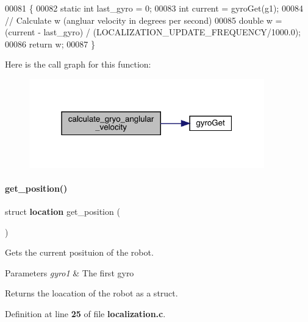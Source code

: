 \begin{DoxyCode}
00081                                                  \{
00082   \textcolor{keyword}{static} \textcolor{keywordtype}{int} last\_gyro = 0;
00083   \textcolor{keywordtype}{int} current = gyroGet(g1);
00084   \textcolor{comment}{// Calculate w (angluar velocity in degrees per second)}
00085   \textcolor{keywordtype}{double} w = (current - last\_gyro) / (LOCALIZATION_UPDATE_FREQUENCY/1000.0);
00086   \textcolor{keywordflow}{return} w;
00087 \}
\end{DoxyCode}
Here is the call graph for this function\+:\nopagebreak
\begin{figure}[H]
\begin{center}
\leavevmode
\includegraphics[width=289pt]{localization_8c_aa849dcc7cd296f4556fab3b57c1c4d3e_cgraph}
\end{center}
\end{figure}
\mbox{\label{localization_8c_aadbff35bb757f60bc348d4d778f57a2f}} 
\paragraph{get\+\_\+position()}
{\footnotesize\ttfamily struct \textbf{ location} get\+\_\+position (\begin{DoxyParamCaption}{ }\end{DoxyParamCaption})}



Gets the current posituion of the robot. 


\begin{DoxyParams}{Parameters}
{\em gyro1} & The first gyro \\
\hline
\end{DoxyParams}
\begin{DoxyReturn}{Returns}
the loacation of the robot as a struct. 
\end{DoxyReturn}


Definition at line \textbf{ 25} of file \textbf{ localization.\+c}.


